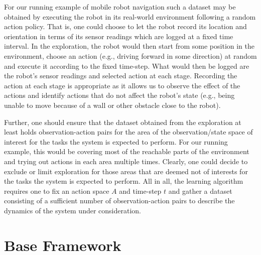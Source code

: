 For our running example of mobile robot navigation such a dataset may be obtained by executing the robot in its real-world environment following a random action policy.
That is, one could choose to let the robot record its location and orientation in terms of its sensor readings which are logged at a fixed time interval.
In the exploration, the robot would then start from some position in the environment, choose an action (e.g., driving forward in some direction) at random and execute it according to the fixed time-step.
What would then be logged are the robot's sensor readings and selected action at each stage.
Recording the action at each stage is appropriate as it allows us to observe the effect of the actions and identify actions that do not affect the robot's state (e.g., being unable to move because of a wall or other obstacle close to the robot).

Further, one should ensure that the dataset obtained from the exploration at least holds observation-action pairs for the area of the observation/state space of interest for the tasks the system is expected to perform.
For our running example, this would be covering most of the reachable parts of the environment and trying out actions in each area multiple times.
Clearly, one could decide to exclude or limit exploration for those areas that are deemed not of interests for the tasks the system is expected to perform.
All in all, the learning algorithm requires one to fix an action space $A$ and time-step $t$ and gather a dataset consisting of a sufficient number of observation-action pairs to describe the dynamics of the system under consideration.

\newpage

\section{Base Framework}
\label{sec:model-learning-routine}

